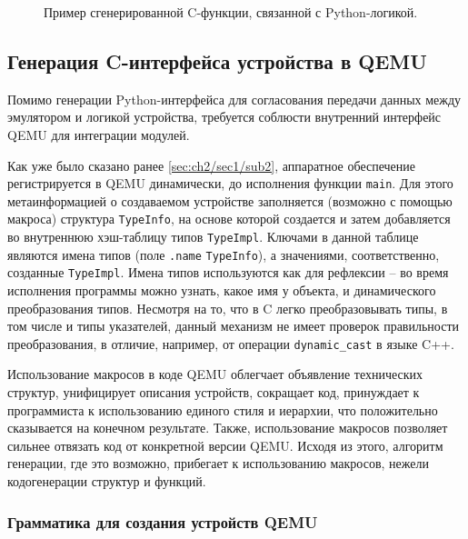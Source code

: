 \begin{figure}[!htbp]
    \centering
    \begin{adjustwidth*}{-1cm}{}
        
    \end{adjustwidth*}
    \caption{Пример сгенерированной C-функции, связанной с Python-логикой.}\label{fig:py-api-func-compilation}
\end{figure}

\subsection{Генерация C-интерфейса устройства в QEMU}\label{sec:ch2/sec1/sub4}

Помимо генерации Python-интерфейса для согласования передачи данных между эмулятором
и логикой устройства, требуется соблюсти внутренний интерфейс QEMU для интеграции
модулей.

Как уже было сказано ранее \ref{sec:ch2/sec1/sub2}, аппаратное обеспечение регистрируется
в QEMU динамически, до исполнения функции \texttt{main}.
Для этого метаинформацией о создаваемом устройстве заполняется (возможно с помощью макроса)
структура \texttt{TypeInfo}, на основе которой создается и затем добавляется во внутреннюю
хэш-таблицу типов \texttt{TypeImpl}. Ключами в данной таблице являются имена типов
(поле \texttt{.name} \texttt{TypeInfo}), а значениями, соответственно, созданные \texttt{TypeImpl}.
Имена типов используются как для рефлексии -- во время исполнения программы можно узнать,
какое имя у объекта, и динамического преобразования типов.
Несмотря на то, что в C легко преобразовывать типы, в том числе и типы указателей, данный
механизм не имеет проверок правильности преобразования, в отличие, например, от
операции \texttt{dynamic\_cast} в языке C++.

Использование макросов в коде QEMU облегчает объявление технических структур,
унифицирует описания устройств, сокращает код, принуждает к программиста к использованию
единого стиля и иерархии, что положительно сказывается на конечном результате.
Также, использование макросов позволяет сильнее отвязать код от конкретной версии
QEMU.
Исходя из этого, алгоритм генерации, где это возможно, прибегает к использованию макросов,
нежели кодогенерации структур и функций.

\subsubsection{Грамматика {\mylanguage} для создания устройств QEMU}\label{sec:ch2/sec1/sub4/sub1}

